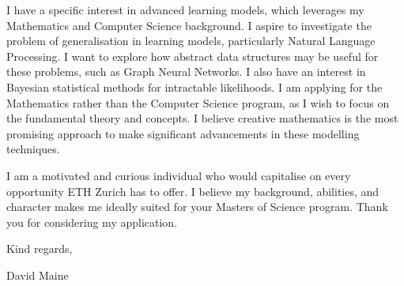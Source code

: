 I have a specific interest in advanced learning models, which leverages my Mathematics and Computer Science background. I aspire to investigate the problem of generalisation in learning models, particularly Natural Language Processing. I want to explore how abstract data structures may be useful for these problems, such as Graph Neural Networks. I also have an interest in Bayesian statistical methods for intractable likelihoods. I am applying for the Mathematics rather than the Computer Science program, as I wish to focus on the fundamental theory and concepts. I believe creative mathematics is the most promising approach to make significant advancements in these modelling techniques.
\vspace*{10pt}

I am a motivated and curious individual who would capitalise on every opportunity ETH Zurich has to offer. I believe my background, abilities, and character makes me ideally suited for your Masters of Science program. Thank you for considering my application.

\vfill
\noindent
Kind regards,
\vspace*{10pt}

\noindent
David Maine